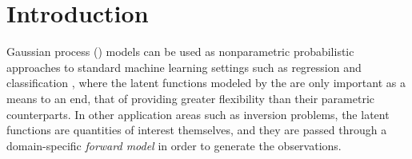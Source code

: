 \section{Introduction}
% 

  
 Gaussian process (\gp) models can be used as nonparametric probabilistic approaches
 to standard machine learning settings such as regression and classification
\cite{rasmussen-williams-book}, where the latent functions modeled by the \gp 
are only important as a means to an end, that of providing 
greater flexibility than their parametric counterparts.
In other application areas such as inversion problems, the latent
functions are quantities of interest themselves,  and they  are passed through
a domain-specific \emph{forward model} in order to generate the observations.
%

